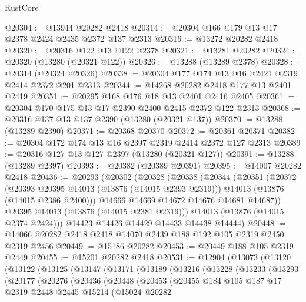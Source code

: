 \begin{lexlean}{RustCore}
\begin{coremodule}
@20304 := @13944 @20282 @2418
@20314 := @20304 @166 @179 @13 @17 @2378 @2424 @2435 @2372 @137 @2313
@20316 := @13272 @20282 @2418
@20320 := @20316 @122 @13 @122 @2378
@20321 := @13281 @20282
@20324 := @20320 (@13280 (@20321 @122))
@20326 := @13288 (@13289 @2378)
@20328 := @20314 (@20324 @20326)
@20338 := @20304 @177 @174 @13 @16 @2421 @2319 @2414 @2372 @201 @2313
@20344 := @14268 @20282 @2418 @177 @13 @2401 @2419
@20351 := @20295 @168 @176 @18 @13 @2401 @2416 @2405
@20361 := @20304 @170 @175 @13 @17 @2390 @2400 @2415 @2372 @122 @2313
@20368 := @20316 @137 @13 @137 @2390 (@13280 (@20321 @137))
@20370 := @13288 (@13289 @2390)
@20371 := @20368 @20370
@20372 := @20361 @20371
@20382 := @20304 @172 @174 @13 @16 @2397 @2319 @2414 @2372 @127 @2313
@20389 := @20316 @127 @13 @127 @2397 (@13280 (@20321 @127))
@20391 := @13288 (@13289 @2397)
@20393 := @20382 (@20389 @20391)
@20395 := @14007 @20282 @2418
@20436 := @20293
    (@20302
      (@20328
        (@20338
          (@20344
            (@20351
              (@20372
                (@20393 @20395 @14013 (@13876 (@14015 @2393 @2319)))
                @14013
                (@13876 (@14015 @2386 @2400)))
              @14666
              @14669
              @14672
              @14676
              @14681
              @14687))
          @20395
          @14013
          (@13876 (@14015 @2381 @2319)))
        @14013
        (@13876 (@14015 @2374 @2424)))
      @14423
      @14426
      @14429
      @14433
      @14438
      @14444)
@20448 := @14066 @20282 @2418 @2418 @14070 @2439 @188 @192 @105 @2319 @2450 @2319 @2456
@20449 := @15186 @20282
@20453 := @20449 @188 @105 @2319 @2449
@20455 := @15201 @20282 @2418
@20531 := @12904
    (@13073
      (@13120
        (@13122
          (@13125
            (@13147
              (@13171
                (@13189
                  (@13216
                    (@13228
                      (@13233
                        (@13293
                          (@20177
                            (@20276
                              (@20436
                                (@20448
                                  (@20453
                                    (@20455
                                      @184
                                      @105
                                      @187
                                      @17
                                      @2319
                                      @2448
                                      @2445
                                      @15214
                                      (@15024
                                        @20282

\end{coremodule}
\end{lexlean}
